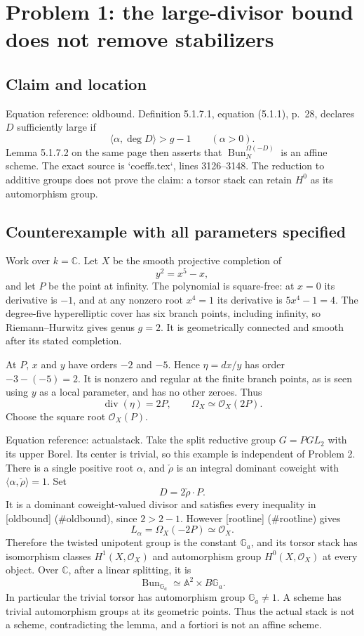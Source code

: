 \documentclass[10pt]{article}
\begin{document}
\section*{Problem 1: the large-divisor bound does not remove stabilizers}
\subsection*{Claim and location}
Equation reference: oldbound. Definition 5.1.7.1, equation (5.1.1), p. 28, declares \(D\) sufficiently large if \[
 \langle\alpha,\deg D\rangle>g-1
 \qquad(\alpha>0).\] Lemma 5.1.7.2 on the same page then asserts that \(\operatorname{Bun}_N^{\Omega(-D)}\) is an affine scheme. The exact source is `coeffs.tex`, lines 3126–3148. The reduction to additive groups does not prove the claim: a torsor stack can retain \(H^0\) as its automorphism group.\par
\subsection*{Counterexample with all parameters specified}
Work over \(k=\mathbb C\). Let \(X\) be the smooth projective completion of \[y^2=x^5-x,\] and let \(P\) be the point at infinity. The polynomial is square-free: at \(x=0\) its derivative is \(-1\), and at any nonzero root \(x^4=1\) its derivative is \(5x^4-1=4\). The degree-five hyperelliptic cover has six branch points, including infinity, so Riemann–Hurwitz gives genus \(g=2\). It is geometrically connected and smooth after its stated completion.\par
At \(P\), \(x\) and \(y\) have orders \(-2\) and \(-5\). Hence \(\eta=dx/y\) has order \(-3-(-5)=2\). It is nonzero and regular at the finite branch points, as is seen using \(y\) as a local parameter, and has no other zeroes. Thus \[\operatorname{div}(\eta)=2P,\qquad
 \Omega_X\simeq\mathcal O_X(2P).\] Choose the square root \(\mathcal O_X(P)\).\par
Equation reference: actualstack. Take the split reductive group \(G=PGL_2\) with its upper Borel. Its center is trivial, so this example is independent of Problem 2. There is a single positive root \(\alpha\), and \(\check\rho\) is an integral dominant coweight with \(\langle\alpha,\check\rho\rangle=1\). Set \[D=2\check\rho\cdot P.\] It is a dominant coweight-valued divisor and satisfies every inequality in [oldbound] (\#oldbound), since \(2>2-1\). However [rootline] (\#rootline) gives \[L_\alpha=\Omega_X(-2P)\simeq\mathcal O_X.\] Therefore the twisted unipotent group is the constant \(\mathbb G_a\), and its torsor stack has isomorphism classes \(H^1(X,\mathcal O_X)\) and automorphism group \(H^0(X,\mathcal O_X)\) at every object. Over \(\mathbb C\), after a linear splitting, it is \[
 \operatorname{Bun}_{\mathbb G_a}\simeq \mathbb A^2\times B\mathbb G_a.\] In particular the trivial torsor has automorphism group \(\mathbb G_a\ne1\). A scheme has trivial automorphism groups at its geometric points. Thus the actual stack is not a scheme, contradicting the lemma, and a fortiori is not an affine scheme.\par
\end{document}
